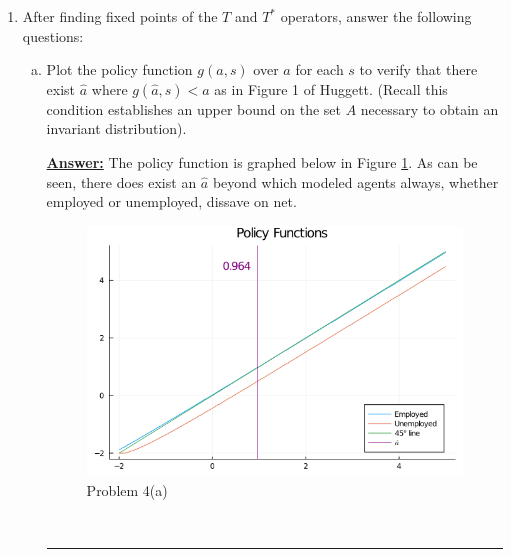 \documentclass{article} %
\theoremstyle{definition}
\newenvironment{solution}[1][Answer]{\begin{singlespace}\underline{\textbf{#1:}}\quad }{\ \rule{0.3em}{0.3em}\end{singlespace}} %
\begin{document}
\begin{enumerate}[I.]
		\begin{enumerate}[4.]
			\item After finding fixed points of the $ T $ and $ T^* $ operators, answer the following questions:
			\begin{enumerate}[a.]
				\item  Plot the policy function $ g(a, s) $ over $ a $ for each $ s $ to verify that there exist $ \hat{a} $ where
				$ g(\hat{a}, s) < \hat{a} $ as in Figure 1 of Huggett. (Recall this condition establishes an upper bound on
				the set $ A $ necessary to obtain an invariant distribution).
				\begin{solution}
					The policy function is graphed below in Figure \ref{4a}. As can be seen, there does exist an $\hat{a}$ beyond which modeled agents always, whether employed or unemployed, dissave on net.
					\begin{figure}[htbp!]
					\centering
					\includegraphics[scale=.5]{ForIncludingInDocument/Policy_Functions.png}
					\caption{Problem 4(a) \label{4a}}
					\end{figure}
				\end{solution}


\end{enumerate}
\end{enumerate}
\end{enumerate}
\end{document}
